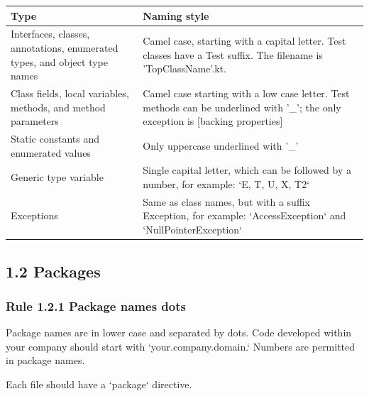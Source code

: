 \begin{center}

\begin{tabular}{ |p{}|p{}| }

\hline

Type&Naming style\\

\hline

 Interfaces, classes, annotations, enumerated types, and object type names & Camel case, starting with a capital letter. Test classes have a Test suffix. The filename is 'TopClassName'.kt.  \\

 Class fields, local variables, methods, and method parameters & Camel case starting with a low case letter. Test methods can be underlined with '\_'; the only exception is [backing properties]\\

 Static constants and enumerated values & Only uppercase underlined with '\_' \\

 Generic type variable & Single capital letter, which can be followed by a number, for example: `E, T, U, X, T2` \\

 Exceptions & Same as class names, but with a suffix Exception, for example: `AccessException` and `NullPointerException`\\

\hline

\end{tabular}

\end{center}

\subsection*{\textbf{1.2 Packages}}



\subsubsection*{\textbf{Rule 1.2.1 Package names dots}}
\leavevmode\newline

Package names are in lower case and separated by dots. Code developed within your company should start with `your.company.domain.` Numbers are permitted in package names.

Each file should have a `package` directive.

